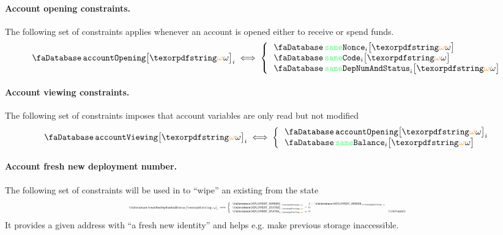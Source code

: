 \paragraph*{Account opening constraints.} The following set of constraints applies whenever an account is opened either to receive or spend funds.
\[
	\accOpening {\relof} _{i}
	\iff
	\left\{ \begin{array}{lcl}
		\accSameNonce      {i}{\relof} \\ 
		\accSameCode       {i}{\relof} \\
		\accSameDeployment {i}{\relof} \\
	\end{array} \right.
\]

\paragraph*{Account viewing constraints.} The following set of constraints imposes that account variables are only read but not modified
\[
	\accViewing {\relof} _{i}
	\iff
	\left\{ \begin{array}{lcl}
		\accOpening      {\relof} _{i} \\ 
		\accSameBalance  {i}{\relof} \\ 
	\end{array} \right.
\]

\paragraph*{Account fresh new deployment number.}
The following set of constraints will be used in  to ``wipe'' an existing from the state
\[
	\resizebox{.95\linewidth}{!}{$
	\accFreshNewDeploymentStatusAndNumber{\relof}_{i}
	\iff
	\left\{ \begin{array}{lclr}
		\accDeploymentNumber\new   _{i + \relof} & \!\!\! = \!\!\! & 1 + \accDeploymentNumber  _{i + \relof} \\
		\accDeploymentStatus\new   _{i + \relof} & \!\!\! = \!\!\! & 0                                       \\
		\accDeploymentStatus       _{i + \relof} & \!\!\! = \!\!\! & 0                                        & (\trash) \\
	\end{array} \right.
	$}
\]
It provides a given address with ``a fresh new identity'' and helps e.g. make previous storage inaccessible.

